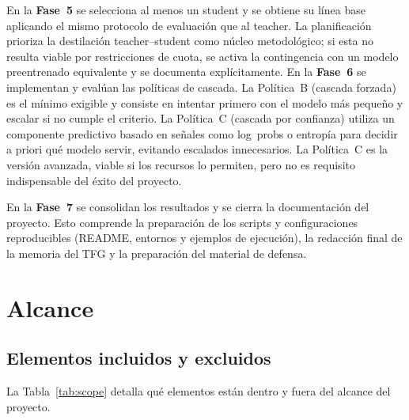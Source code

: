 \documentclass[11pt,a4paper]{article}
\begin{document}
En la \textbf{Fase~5} se selecciona al menos un student y se obtiene su línea base aplicando el mismo protocolo de evaluación que al teacher. La planificación prioriza la destilación teacher--student como núcleo metodológico; si esta no resulta viable por restricciones de cuota, se activa la contingencia con un modelo preentrenado equivalente y se documenta explícitamente. En la \textbf{Fase~6} se implementan y evalúan las políticas de cascada. La Política~B (cascada forzada) es el mínimo exigible y consiste en intentar primero con el modelo más pequeño y escalar si no cumple el criterio. La Política~C (cascada por confianza) utiliza un componente predictivo basado en señales como log~probs o entropía para decidir a priori qué modelo servir, evitando escalados innecesarios. La Política~C es la versión avanzada, viable si los recursos lo permiten, pero no es requisito indispensable del éxito del proyecto.

En la \textbf{Fase~7} se consolidan los resultados y se cierra la documentación del proyecto. Esto comprende la preparación de los scripts y configuraciones reproducibles (README, entornos y ejemplos de ejecución), la redacción final de la memoria del TFG y la preparación del material de defensa.

\section{Alcance}

\subsection{Elementos incluidos y excluidos}

La Tabla~\ref{tab:scope} detalla qué elementos están dentro y fuera del alcance del proyecto.
\end{document}

